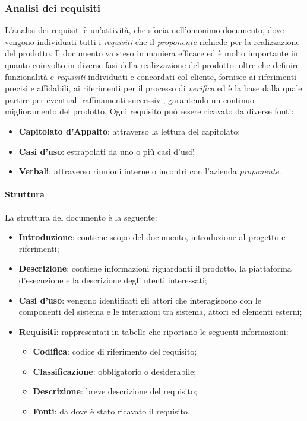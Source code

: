 \subsubsection{Analisi dei requisiti}
L'analisi dei requisiti è un'attività, che sfocia nell'omonimo documento, dove vengono individuati tutti i \emph{requisiti} che il \emph{proponente} richiede per la realizzazione del prodotto.\newline{}
Il documento \AdR{} va steso in maniera efficace ed è molto importante in quanto coinvolto in diverse fasi della realizzazione del prodotto: oltre che definire funzionalità e \emph{requisiti} individuati e concordati col cliente, fornisce ai \progrs{} riferimenti precisi e affidabili, ai \verf{} riferimenti per il processo di \emph{verifica} ed è la base dalla quale partire per eventuali raffinamenti successivi, garantendo un continuo miglioramento del prodotto. 
Ogni requisito può essere ricavato da diverse fonti:
\begin{itemize}
	\item \textbf{Capitolato d'Appalto}: attraverso la lettura del capitolato;
	\item \textbf{Casi d'uso}: estrapolati da uno o più casi d'uso\G; 
	\item \textbf{Verbali}: attraverso riunioni interne o incontri con l'azienda \emph{proponente}.
\end{itemize}

\paragraph{Struttura} \aCapo{}
La struttura del documento \AdR{} è la seguente:
\begin{itemize}
	\item \textbf{Introduzione}: contiene scopo del documento, introduzione al progetto e riferimenti;
	\item \textbf{Descrizione}: contiene informazioni riguardanti il prodotto, la piattaforma d'esecuzione e la descrizione degli utenti interessati;
	\item \textbf{Casi d'uso}: vengono identificati gli attori che interagiscono con le componenti del sistema e le interazioni tra sistema, attori ed elementi esterni;
	\item \textbf{Requisiti}: rappresentati in tabelle che riportano le seguenti informazioni:
		\begin{itemize}
			\item \textbf{Codifica}: codice di riferimento del requisito;
			\item \textbf{Classificazione}: obbligatorio o desiderabile;
			\item \textbf{Descrizione}: breve descrizione del requisito;
			\item \textbf{Fonti}: da dove è stato ricavato il requisito.
		\end{itemize}
\end{itemize}

